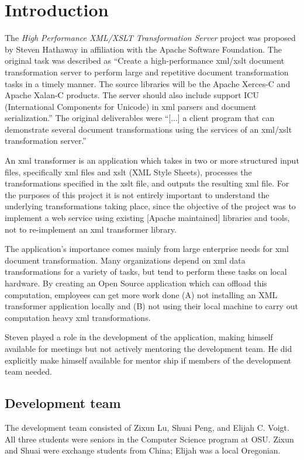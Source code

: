 \section{Introduction}



The \textit{High Performance XML/XSLT Transformation Server} project was proposed by Steven Hathaway in affiliation with the Apache Software Foundation.
The original task was described as ``Create a high-performance \gls{xml}/\gls{xslt} document transformation server to perform large and repetitive document transformation tasks in a timely manner.
The source libraries will be the Apache Xerces-C and Apache Xalan-C products.
The server should also include support ICU (International Components for Unicode) in \gls{xml} parsers and document serialization.''
The original deliverables were ``[...] a client program that can demonstrate several document transformations using the services of an \gls{xml}/\gls{xslt} transformation server.'' 

An \gls{xml} transformer is an application which takes in two or more structured input files, specifically \gls{xml} files and \gls{xslt} (XML Style Sheets), processes the transformations specified in the \gls{xslt} file, and outputs the resulting \gls{xml} file.
For the purposes of this project it is not entirely important to understand the underlying transformations taking place, since the objective of the project was to implement a web service using existing [Apache maintained] libraries and tools, not to re-implement an \gls{xml} transformer library.

The application's importance comes mainly from large enterprise needs for \gls{xml} document transformation.
Many organizations depend on \gls{xml} data transformations for a variety of tasks, but tend to perform these tasks on local hardware.
By creating an Open Source application which can offload this computation, employees can get more work done (A) not installing an XML transformer application locally and (B) not using their local machine to carry out computation heavy \gls{xml} transformations.

Steven played a role in the development of the application, making himself available for meetings but not actively mentoring the development team. He did explicitly make himself available for mentor ship if members of the development team needed.

\subsection{Development team}

The development team consisted of Zixun Lu, Shuai Peng, and Elijah C. Voigt.
All three students were seniors in the Computer Science program at OSU.
Zixun and Shuai were exchange students from China; Elijah was a local Oregonian.
